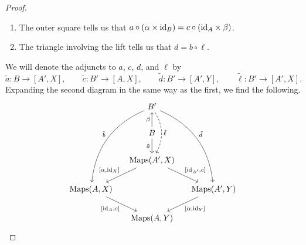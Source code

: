 \documentclass[main.tex]{subfiles}
\begin{document}
\begin{proof}
\begin{enumerate}
    \item The outer square tells us that $a \circ (\alpha \times \mathrm{id}_{B}) = c \circ (\mathrm{id}_{A} \times \beta)$.

    \item The triangle involving the lift tells us that $d = b \circ \ell$.
  \end{enumerate}

  We will denote the adjuncts to $a$, $c$, $d$, and $\ell$ by
  \begin{equation*}
    \tilde{a}\colon B \to [A', X],\qquad \tilde{c}\colon B' \to [A, X],\qquad \tilde{d}\colon B' \to [A', Y],\qquad \tilde{\ell}\colon B' \to [A', X].
  \end{equation*}
  Expanding the second diagram in the same way as the first, we find the following.
  \begin{equation*}
    \begin{tikzcd}[column sep=small]
      & B'
      \arrow[dd, bend left, dashed, "\tilde{\ell}"]
      \arrow[dddr, bend left, "\tilde{d}"]
      \arrow[dddl, bend right, swap, "\tilde{b}"]
      \\
      & B
      \arrow[u, "\beta"]
      \arrow[d, swap, "\tilde{a}"]
      \\
      & \Maps(A', X)
      \arrow[dr, "{[\id_{A'}, c]}"]
      \arrow[dl, swap, "{[\alpha, \id_{X}]}"]
      \\
      \Maps(A, X)
      \arrow[dr, swap, "{[\id_{A}, c]}"]
      && \Maps(A', Y)
      \arrow[dl, "{[\alpha, \id_{Y}]}"]
      \\
      & \Maps(A, Y)
    \end{tikzcd}
  \end{equation*}
\end{proof}
\end{document}
